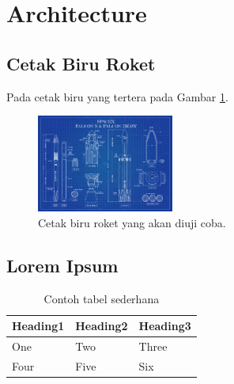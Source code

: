\section{Architecture}
\label{sec:architecture}


\subsection{Cetak Biru Roket}
\label{subsec:cetakbiruroket}

Pada cetak biru yang tertera pada Gambar \ref{fig:cetakbiru}. \lipsum[8]

\begin{figure} [ht]
  \centering
  \includegraphics[width=0.4\textwidth]{gambar/cetakbiru.jpg}

  \caption{Cetak biru roket yang akan diuji coba. \cite{cetakbiruspacex}}
  \label{fig:cetakbiru}
\end{figure}

\lipsum[9-10]

\subsection{Lorem Ipsum}
\label{subsec:loremipsum}

\lipsum[11]

\begin{table}
  \caption{Contoh tabel sederhana}
  \label{tab:tabelsederhana}
  \centering
  \begin{tabular}{lll}
    \toprule
    Heading1 & Heading2 & Heading3 \\
    \midrule
    One      & Two      & Three    \\
    Four     & Five     & Six      \\
    \bottomrule
  \end{tabular}
\end{table}

